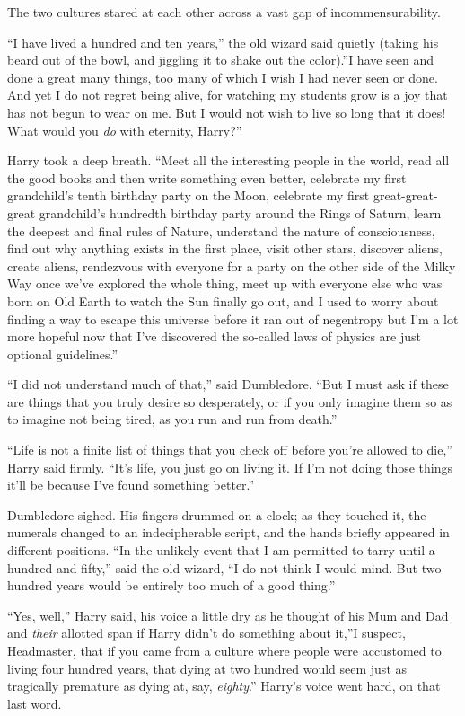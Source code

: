 The two cultures stared at each other across a vast gap of
incommensurability.

``I have lived a hundred and ten years,'' the old wizard said quietly
(taking his beard out of the bowl, and jiggling it to shake out the
color).''I have seen and done a great many things, too many of which I
wish I had never seen or done. And yet I do not regret being alive, for
watching my students grow is a joy that has not begun to wear on me. But
I would not wish to live so long that it does! What would you \emph{do}
with eternity, Harry?''

Harry took a deep breath. ``Meet all the interesting people in the
world, read all the good books and then write something even better,
celebrate my first grandchild's tenth birthday party on the Moon,
celebrate my first great-great-great grandchild's hundredth birthday
party around the Rings of Saturn, learn the deepest and final rules of
Nature, understand the nature of consciousness, find out why anything
exists in the first place, visit other stars, discover aliens, create
aliens, rendezvous with everyone for a party on the other side of the
Milky Way once we've explored the whole thing, meet up with everyone
else who was born on Old Earth to watch the Sun finally go out, and I
used to worry about finding a way to escape this universe before it ran
out of negentropy but I'm a lot more hopeful now that I've discovered
the so-called laws of physics are just optional guidelines.''

``I did not understand much of that,'' said Dumbledore. ``But I must ask
if these are things that you truly desire so desperately, or if you only
imagine them so as to imagine not being tired, as you run and run from
death.''

``Life is not a finite list of things that you check off before you're
allowed to die,'' Harry said firmly. ``It's life, you just go on living
it. If I'm not doing those things it'll be because I've found something
better.''

Dumbledore sighed. His fingers drummed on a clock; as they touched it,
the numerals changed to an indecipherable script, and the hands briefly
appeared in different positions. ``In the unlikely event that I am
permitted to tarry until a hundred and fifty,'' said the old wizard, ``I
do not think I would mind. But two hundred years would be entirely too
much of a good thing.''

``Yes, well,'' Harry said, his voice a little dry as he thought of his
Mum and Dad and \emph{their} allotted span if Harry didn't do something
about it,''I suspect, Headmaster, that if you came from a culture where
people were accustomed to living four hundred years, that dying at two
hundred would seem just as tragically premature as dying at, say,
\emph{eighty}.'' Harry's voice went hard, on that last word.

